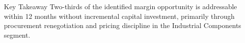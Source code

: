 \vspace{14pt}

\begin{calloutbox}[navy]{Key Takeaway}
Two-thirds of the identified margin opportunity is addressable within 12 months without incremental capital investment, primarily through procurement renegotiation and pricing discipline in the Industrial Components segment.
\end{calloutbox}

\clearpage


